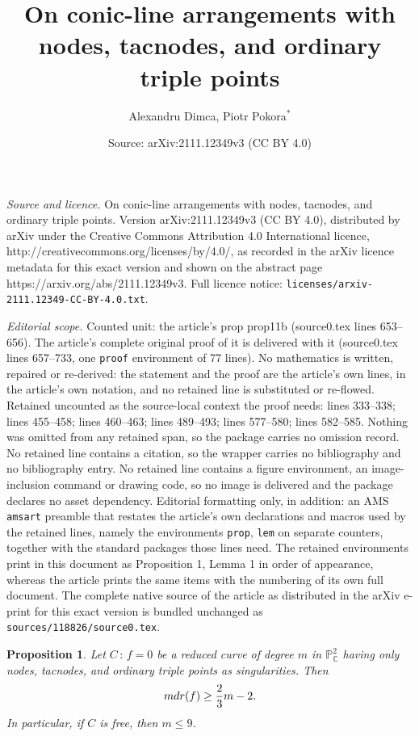 \documentclass[10pt,a4paper]{amsart}
\title{On conic-line arrangements with nodes, tacnodes, and ordinary triple points}
\author{Alexandru Dimca, Piotr Pokora$^{\ast}$}
\date{Source: arXiv:2111.12349v3 (CC BY 4.0)}
\newtheorem{prop}{Proposition}
\begin{document}
\maketitle

\noindent\emph{Source and licence.} On conic-line arrangements with nodes, tacnodes, and ordinary triple points. Version arXiv:2111.12349v3 (CC BY 4.0), distributed by arXiv under the Creative Commons Attribution 4.0 International licence, http://creativecommons.org/licenses/by/4.0/, as recorded in the arXiv licence metadata for this exact version and shown on the abstract page https://arxiv.org/abs/2111.12349v3. Full licence notice: \texttt{licenses/arxiv-2111.12349-CC-BY-4.0.txt}.\par\smallskip

\noindent\textit{Editorial scope.} Counted unit: the article's prop prop11b (source0.tex lines 653--656). The article's complete original proof of it is delivered with it (source0.tex lines 657--733, one \texttt{proof} environment of 77 lines). No mathematics is written, repaired or re-derived: the statement and the proof are the article's own lines, in the article's own notation, and no retained line is substituted or re-flowed.  Retained uncounted as the source-local context the proof needs: lines 333--338; lines 455--458; lines 460--463; lines 489--493; lines 577--580; lines 582--585.  Nothing was omitted from any retained span, so the package carries no omission record.  No retained line contains a citation, so the wrapper carries no bibliography and no bibliography entry.  No retained line contains a figure environment, an image-inclusion command or drawing code, so no image is delivered and the package declares no asset dependency.  Editorial formatting only, in addition: an AMS \texttt{amsart} preamble that restates the article's own declarations and macros used by the retained lines, namely the environments \texttt{prop}, \texttt{lem} on separate counters, together with the standard packages those lines need.  The retained environments print in this document as Proposition 1, Lemma 1 in order of appearance, whereas the article prints the same items with the numbering of its own full document.  The complete native source of the article as distributed in the arXiv e-print for this exact version is bundled unchanged as \texttt{sources/118826/source0.tex}.
\begin{prop}
\label{prop:bound9}
Let $C \, : \, f=0$ be a reduced curve of degree $m$ in $\mathbb{P}^{2}_{\mathbb{C}}$ having only nodes, tacnodes, and ordinary triple points as singularities. Then
$${\rm mdr}(f) \geq \frac{2}{3}m-2.$$
In particular, if $C$ is free, then $m \leq 9$.
\end{prop}
\end{document}
